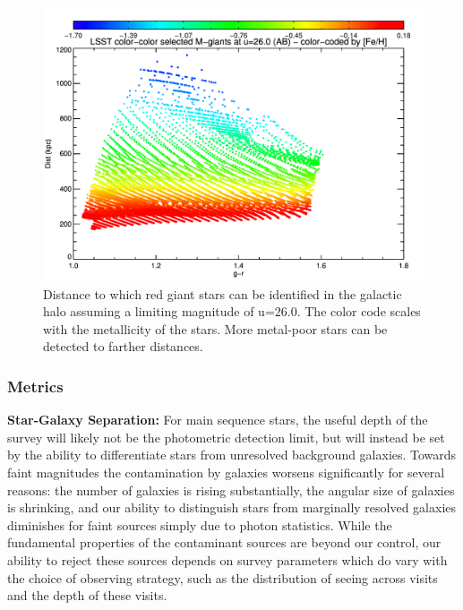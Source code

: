 \begin{figure}[h]
\begin{center}
  \includegraphics[scale=0.5]{./figs/milkyway/lsst_mgiants_grdist.pdf}
  \caption{Distance to which red giant stars can be identified in the galactic halo assuming a limiting magnitude
  of u=26.0. The color code scales with the metallicity of the stars. More metal-poor stars can be
  detected to farther distances. \label{fig-MW-giants}}
\end{center}
\end{figure}



\subsubsection{Metrics}
\label{sec:\secname:MW_Halo_metrics}

\textbf{Star-Galaxy Separation:} For main sequence stars, the useful depth of
the survey will likely not be the photometric detection limit, but will instead
be set by the ability to differentiate stars from unresolved background
galaxies. Towards faint magnitudes the contamination by galaxies worsens
significantly for several reasons: the number of galaxies is rising
substantially, the angular size of galaxies is shrinking, and our ability to
distinguish stars from marginally resolved galaxies diminishes for faint
sources simply due to photon statistics. While the fundamental properties of
the contaminant sources are beyond our control, our ability to reject these
sources depends on survey parameters which do vary with the choice of observing strategy, such as the distribution of seeing across
visits and the depth of these visits.

